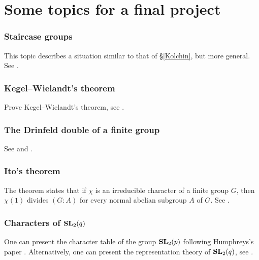 \chapter*{Some topics for a final project}

\pagestyle{plain}
\fancyhf{}
\fancyfoot[CE,CO]{\leftmark}
\fancyfoot[LE,RO]{\thepage}


\subsection*{Staircase groups}

This topic describes a situation similar to that of \S\ref{Kolchin}, but
more general. See \cite[Chapter 5]{MR1369573}.

\subsection*{Kegel--Wielandt's theorem}

Prove Kegel--Wielandt's theorem, see 
\cite[Theorem 2.13]{MR1211633}.

\subsection*{The Drinfeld double of a finite group}

See \cite[Chapter IX]{MR1321145} and 
\cite[Chapter 8]{MR3752618}.

\subsection*{Ito's theorem}

The theorem states that if $\chi$ is an irreducible character
of a finite group $G$, then $\chi(1)$ divides 
$(G:A)$ for every normal abelian subgroup $A$ of $G$. 
See \cite[\S8.1]{MR0450380}. 

\subsection*{Characters of $\mathbf{SL}_2(q)$}

One can present the character table of the group $\mathbf{SL}_2(p)$  
following Humphreys's paper \cite{MR364478}. Alternatively, one can present
the representation theory of $\mathbf{SL}_2(q)$, see \cite[Chapter 20]{MR1650707}.


